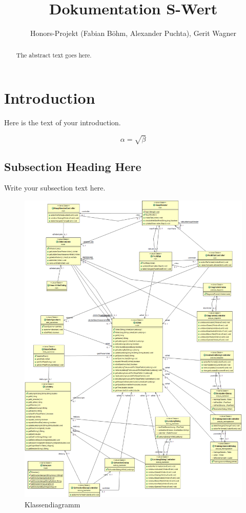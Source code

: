 \documentclass{article}
\begin{document}
\title{Dokumentation S-Wert}
\author{Honors-Projekt (Fabian Böhm, Alexander Puchta), Gerit Wagner}

\maketitle

\begin{abstract}
The abstract text goes here.
\end{abstract}

\section{Introduction}
Here is the text of your introduction.

\begin{equation}
    \label{simple_equation}
    \alpha = \sqrt{ \beta }
\end{equation}

\subsection{Subsection Heading Here}
Write your subsection text here.

\begin{figure}
    \centering
    \includegraphics[width=6.0in]{../_diagrams/classes.png}
    \caption{Klassendiagramm}
    \label{classes}
\end{figure}
\end{document}
